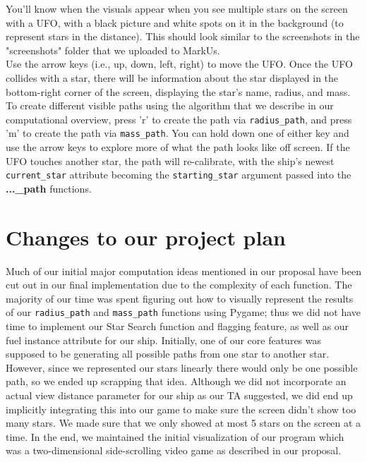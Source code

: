 \documentclass[fontsize=11pt]{article}
\begin{document}
You'll know when the visuals appear when you see multiple stars on the screen with a UFO, with a black picture and white spots on it in the background (to represent stars in the distance). This should look similar to the screenshots in the "screenshots" folder that we uploaded to MarkUs.\\

Use the arrow keys (i.e., up, down, left, right) to move the UFO. Once the UFO collides with a star, there will be information about the star displayed in the bottom-right corner of the screen, displaying the star's name, radius, and mass.\\

To create different visible paths using the algorithm that we describe in our computational overview, press 'r' to create the path via \texttt{radius\_path}, and press 'm' to create the path via \texttt{mass\_path}. You can hold down one of either key and use the arrow keys to explore more of what the path looks like off screen. If the UFO touches another star, the path will re-calibrate, with the ship's newest \texttt{current\_star} attribute becoming the \texttt{starting\_star} argument passed into the \textbf{...\_path} functions.

\section*{Changes to our project plan}
Much of our initial major computation ideas mentioned in our proposal have been cut out in our final implementation due to the complexity of each function. The majority of our time was spent figuring out how to visually represent the results of our \texttt{radius\_path} and \texttt{mass\_path} functions using Pygame; thus we did not have time to implement our Star Search function and flagging feature, as well as our fuel instance attribute for our ship. Initially, one of our core features was supposed to be generating all possible paths from one star to another star. However, since we represented our stars linearly there would only be one possible path, so we ended up scrapping that idea. Although we did not incorporate an actual view distance parameter for our ship as our TA suggested, we did end up implicitly integrating this into our game to make sure the screen didn’t show too many stars. We made sure that we only showed at most 5 stars on the screen at a time. In the end, we maintained the initial visualization of our program which was a two-dimensional side-scrolling video game as described in our proposal.
\end{document}
